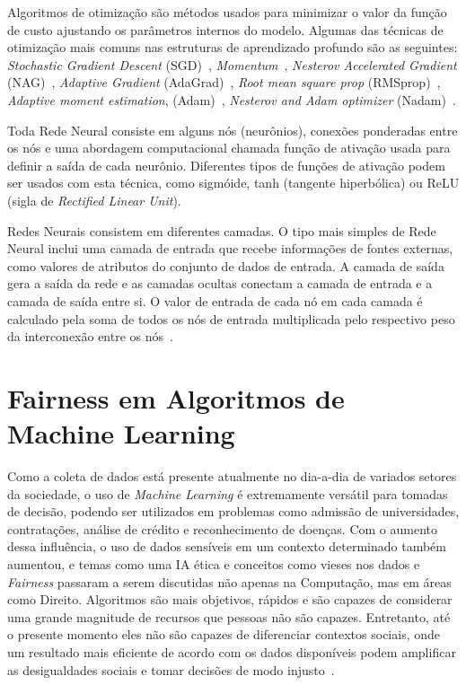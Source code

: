 \documentclass[portugues]{ic-tese}
\begin{document}
Algoritmos de otimização são métodos usados para minimizar o valor da função de custo ajustando os parâmetros internos do modelo. Algumas das técnicas de otimização mais comuns nas estruturas de aprendizado profundo são as seguintes: \textit{Stochastic Gradient Descent} (SGD)~\citep{Schmidt_2013}, \textit{Momentum}~\citep{Polyak_1964}, \textit{Nesterov Accelerated Gradient} (NAG)~\citep{Sutskever_2013}, \textit{Adaptive Gradient} (AdaGrad)~\citep{Duchi_2011}, \textit{Root mean square prop} (RMSprop)~\citep{Graves_2013}, \textit{Adaptive moment estimation}, (Adam)~\citep{Kingma_2014}, \textit{Nesterov and Adam optimizer} (Nadam)~\citep{Dozat_2016}.

Toda Rede Neural consiste em alguns nós (neurônios), conexões ponderadas entre os nós e uma abordagem computacional chamada função de ativação usada para definir a saída de cada neurônio. Diferentes tipos de funções de ativação podem ser usados com esta técnica, como sigmóide, tanh (tangente hiperbólica) ou ReLU (sigla de \textit{Rectified Linear Unit}).

Redes Neurais consistem em diferentes camadas. O tipo mais simples de Rede Neural inclui uma camada de entrada que recebe informações de fontes externas, como valores de atributos do conjunto de dados de entrada. A camada de saída gera a saída da rede e as camadas ocultas conectam a camada de entrada e a camada de saída entre si. O valor de entrada de cada nó em cada camada é calculado pela soma de todos os nós de entrada multiplicada pelo respectivo peso da interconexão entre os nós~\citep{Erb_1993}.

\section{Fairness em Algoritmos de Machine Learning}
\label{sec:Fairness}

Como a coleta de dados está presente atualmente no dia-a-dia de variados setores da sociedade, o uso de \textit{Machine Learning} é extremamente versátil para tomadas de decisão, podendo ser utilizados em problemas como admissão de universidades, contratações, análise de crédito e reconhecimento de doenças. Com o aumento dessa influência, o uso de dados sensíveis em um contexto determinado também aumentou, e temas como uma IA ética e conceitos como vieses nos dados e \textit{Fairness} passaram a serem discutidas não apenas na Computação, mas em áreas como Direito. Algoritmos são mais objetivos, rápidos e são capazes de considerar uma grande magnitude de recursos que pessoas não são capazes. Entretanto, até o presente momento eles não são capazes de diferenciar contextos sociais, onde um resultado mais eficiente de acordo com os dados disponíveis podem amplificar as desigualdades sociais e tomar decisões de modo injusto~\citep{Mehrabi_2021}. 
\end{document}
